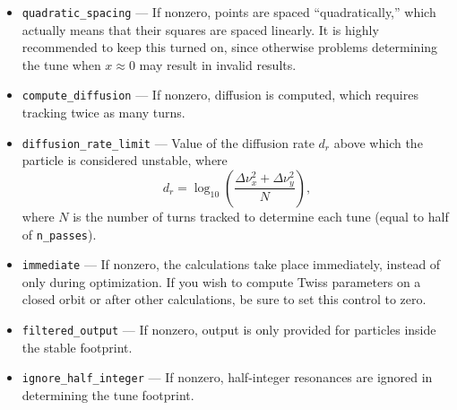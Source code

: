 \documentclass[11pt]{article}
\begin{document}
\begin{itemize}
\item \verb|quadratic_spacing| --- If nonzero, points are spaced ``quadratically,'' which actually means that
  their squares are spaced linearly. It is highly recommended to keep this turned on, since otherwise problems determining the
  tune when $x \approx 0$ may result in invalid results.
\item \verb|compute_diffusion| --- If nonzero, diffusion is computed, which requires tracking twice as many turns.
\item \verb|diffusion_rate_limit| --- Value of the diffusion rate $d_r$ above which the particle is considered unstable,
where
\begin{equation}
  d_r = \log_{10} \left(\frac{\Delta\nu_x^2 + \Delta\nu_y^2}{N}\right),
\end{equation}
where $N$ is the number of turns tracked to determine each tune (equal to half of \verb|n_passes|).
\item \verb|immediate| --- If nonzero, the calculations take place immediately, instead of only during optimization.
  If you wish to compute Twiss parameters on a closed orbit or after other calculations, be sure to set this control to zero.
\item \verb|filtered_output| --- If nonzero, output is only provided for particles inside the stable footprint.
\item \verb|ignore_half_integer| --- If nonzero, half-integer resonances are ignored in determining the tune footprint.
\end{itemize}
\end{document}
